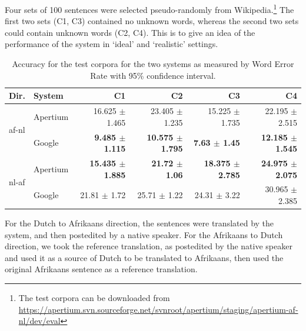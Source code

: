\documentclass[11pt]{article}
\begin{document}
Four sets of 100 sentences were selected pseudo-randomly from Wikipedia.\footnote{The test corpora can be downloaded
  from \url{https://apertium.svn.sourceforge.net/svnroot/apertium/staging/apertium-af-nl/dev/eval}} The first two sets (C1, C3) contained 
no unknown words, whereas the second two sets could contain unknown words (C2, C4). This is to give an idea
of the performance of the system in `ideal' and `realistic' settings.

\begin{table}
  \begin{center}
  \begin{tabular}{|l|l|r|r|r|r|}
   \hline
   {\bf Dir.} & {\bf System}             & {\bf C1}          & {\bf C2} & {\bf C3} & {\bf C4} \\ 
   \hline
   \multirow{2}{*}{af-nl}  & {\small Apertium}  & 16.625 $\pm$ 1.465 & 23.405 $\pm$ 1.235 & 15.225 $\pm$ 1.735 & 22.195 $\pm$ 2.515 \\ 
                           & {\small Google}  & {\bf 9.485 $\pm$ 1.115} & {\bf 10.575 $\pm$ 1.795} & {\bf 7.63 $\pm$ 1.45} & {\bf 12.185 $\pm$ 1.545} \\ 
   \hline
    \multirow{2}{*}{nl-af} & {\small Apertium }  & {\bf 15.435 $\pm$ 1.885}  & {\bf 21.72 $\pm$ 1.06} & {\bf 18.375 $\pm$ 2.785} & {\bf 24.975 $\pm$ 2.075} \\
                           & {\small Google }  & 21.81 $\pm$ 1.72& 	25.71 $\pm$ 1.22&	24.31 $\pm$ 3.22&	30.965 $\pm$ 2.385 \\ 

   \hline
  \end{tabular}
    \caption{Accuracy for the test corpora for the two systems as measured by Word Error Rate 
        with 95\% confidence interval.}
    \label{table:quan}
  \end{center}
\end{table}

For the Dutch to Afrikaans direction, the sentences were translated by the system, and then
postedited by a native speaker. For the Afrikaans to Dutch direction, we took the reference 
translation, as postedited by the native speaker and used it as a source of Dutch to be translated
to Afrikaans, then used the original Afrikaans sentence as a reference translation.

\end{document}
